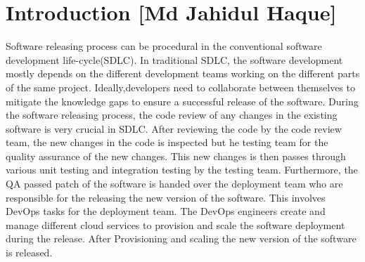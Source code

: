 
\section{Introduction [Md Jahidul Haque]}
Software  releasing  process  can  be  procedural  in  the  conventional  software  development life-cycle(SDLC). In traditional SDLC, the software development mostly depends on the different development teams working on the different parts of the same project.  Ideally,developers  need  to  collaborate  between  themselves  to  mitigate  the  knowledge  gaps  to ensure a successful release of the software.  During the software releasing process, the code review of any changes in the existing software is very crucial in SDLC. After reviewing the code by the code review team, the new changes in the code is inspected but he testing team for the quality assurance of the new changes.  This new changes is then passes through various unit testing and integration testing by the testing team.  Furthermore,  the QA passed  patch  of  the  software  is  handed  over  the  deployment  team  who  are  responsible for  the  releasing  the  new  version  of  the  software.   This  involves  DevOps  tasks  for  the deployment team.  The DevOps engineers create and manage different cloud services to provision and scale the software deployment during the release.  After Provisioning and scaling the new version of the software is released.